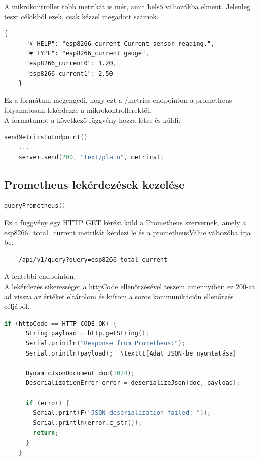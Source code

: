 A mikrokontroller több metrikát is mér, 
amit belső változókba elment. Jelenleg teszt célokból ezek, csak kézzel megadott számok.

\begin{lstlisting}[language=HTML]
    {
      "# HELP": "esp8266_current Current sensor reading.",
      "# TYPE": "esp8266_current gauge",
      "esp8266_current0": 1.20,
      "esp8266_current1": 2.50
    }
\end{lstlisting}

Ez a formátum megengedi, hogy ezt a /metrics endpointon a prometheus folyamatosan lekérdezze a mikrokontrollerektől. \\

A formátumot a következő függvény hozza létre és küldi:

\begin{lstlisting}[language=C]
    sendMetricsToEndpoint()
    ...
    server.send(200, "text/plain", metrics);
\end{lstlisting}

\subsection{Prometheus lekérdezések kezelése}

\begin{lstlisting}[language=C]
    queryPrometheus()
\end{lstlisting}

Ez a függvény egy HTTP GET kérést küld a Prometheus szervernek, amely a esp8266\_total\_current 
metrikát kérdezi le és a prometheusValue változóba írja be.

\begin{lstlisting}
    /api/v1/query?query=esp8266_total_current
\end{lstlisting}

A fentebbi endpointon. \\
A lekérdezés sikerességét a httpCode ellenőrzésével teszem amennyiben ez 200-at ad vissza az értéket eltárolom 
és kiírom a soros kommunikáción ellenőrzés céljából.

\begin{lstlisting}[language=C]
    if (httpCode == HTTP_CODE_OK) {
      String payload = http.getString();
      Serial.println("Response from Prometheus:");
      Serial.println(payload);  \texttt{Adat JSON-be nyomtatása}

      DynamicJsonDocument doc(1024);
      DeserializationError error = deserializeJson(doc, payload);

      if (error) {
        Serial.print(F("JSON deserialization failed: "));
        Serial.println(error.c_str());
        return;
      }
    }
\end{lstlisting}

